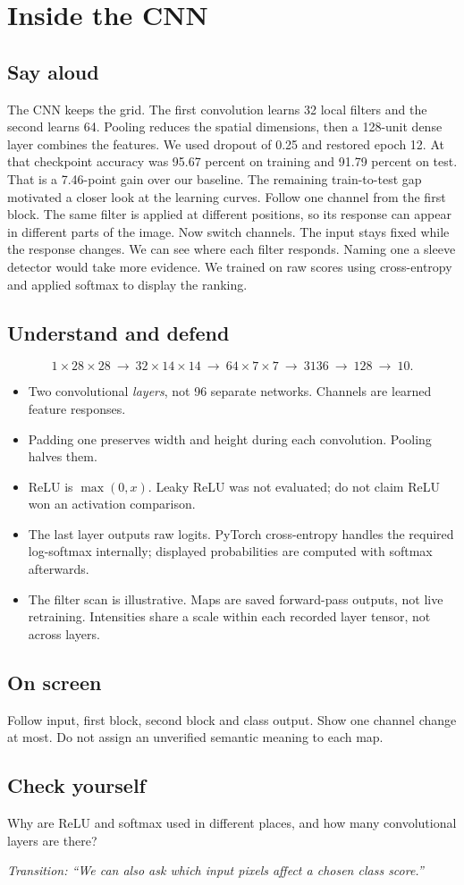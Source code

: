 \documentclass[11pt,a4paper]{article}
\newcommand{\slide}[3]{\clearpage{\small\color{olive}SLIDE #1\hfill Target: #3}\par\section{#2}}
\newcommand{\say}{\subsection{Say aloud}}
\newcommand{\understand}{\subsection{Understand and defend}}
\newcommand{\screen}{\subsection{On screen}}
\newcommand{\selfcheck}[1]{\subsection{Check yourself}#1}
\newcommand{\transition}[1]{\par\smallskip\textit{Transition: #1}}
\begin{document}
\slide{7}{Inside the CNN}{70 seconds}
\say
The CNN keeps the grid. The first convolution learns 32 local filters and the second learns 64. Pooling reduces the spatial dimensions, then a 128-unit dense layer combines the features. We used dropout of 0.25 and restored epoch 12. At that checkpoint accuracy was 95.67 percent on training and 91.79 percent on test. That is a 7.46-point gain over our baseline. The remaining train-to-test gap motivated a closer look at the learning curves. Follow one channel from the first block. The same filter is applied at different positions, so its response can appear in different parts of the image. Now switch channels. The input stays fixed while the response changes. We can see where each filter responds. Naming one a sleeve detector would take more evidence. We trained on raw scores using cross-entropy and applied softmax to display the ranking.
\understand
\[
1\!\times\!28\!\times\!28\ \longrightarrow\ 32\!\times\!14\!\times\!14\
\longrightarrow\ 64\!\times\!7\!\times\!7\ \longrightarrow\ 3136\ \longrightarrow\ 128\ \longrightarrow\ 10.
\]
\begin{itemize}
\item Two convolutional \emph{layers}, not 96 separate networks. Channels are learned feature responses.
\item Padding one preserves width and height during each convolution. Pooling halves them.
\item ReLU is $\max(0,x)$. Leaky ReLU was not evaluated; do not claim ReLU won an activation comparison.
\item The last layer outputs raw logits. PyTorch cross-entropy handles the required log-softmax internally; displayed probabilities are computed with softmax afterwards.
\item The filter scan is illustrative. Maps are saved forward-pass outputs, not live retraining. Intensities share a scale within each recorded layer tensor, not across layers.
\end{itemize}
\screen
Follow input, first block, second block and class output. Show one channel change at most. Do not assign an unverified semantic meaning to each map.
\selfcheck{Why are ReLU and softmax used in different places, and how many convolutional layers are there?}
\transition{``We can also ask which input pixels affect a chosen class score.''}
\end{document}
